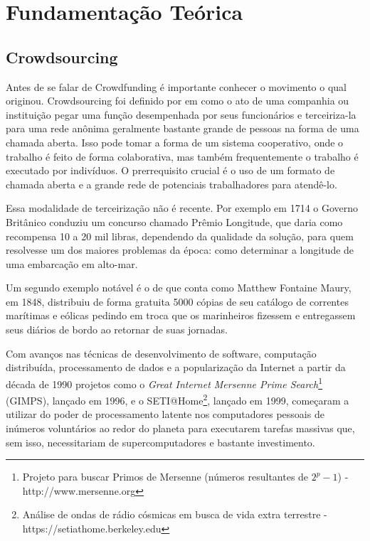 \chapter{Fundamentação Teórica}

\section{Crowdsourcing}
Antes de se falar de Crowdfunding é importante conhecer o movimento o qual originou. Crowdsourcing foi definido por \citeauthor{wired-crowdsource} em \citeyear{wired-crowdsource} como o ato de uma companhia ou instituição pegar uma função desempenhada por seus funcionários e terceiriza-la para uma rede anônima geralmente bastante grande de pessoas na forma de uma chamada aberta. Isso pode tomar a forma de um sistema cooperativo, onde o trabalho é feito de forma colaborativa, mas também frequentemente o trabalho é executado por indivíduos. O prerrequisito crucial é o uso de um formato de chamada aberta e a grande rede de potenciais trabalhadores para atendê-lo.

Essa modalidade de terceirização não é recente. Por exemplo em 1714 o Governo Britânico conduziu um concurso chamado Prêmio Longitude\cite{wiki-longitude_rewards}, que daria como recompensa 10 a 20 mil libras, dependendo da qualidade da solução, para quem resolvesse um dos maiores problemas da época: como determinar a longitude de uma embarcação em alto-mar.

Um segundo exemplo notável é o de \citeauthor{hearn2002tracks} que conta como Matthew Fontaine Maury, em 1848, distribuiu de forma gratuita 5000 cópias de seu catálogo de correntes marítimas e eólicas pedindo em troca que os marinheiros fizessem e entregassem seus diários de bordo ao retornar de suas jornadas.

Com avanços nas técnicas de desenvolvimento de software, computação distribuída, processamento de dados e a popularização da Internet a partir da década de 1990 projetos como o \emph{Great Internet Mersenne Prime Search}\footnote{Projeto para buscar Primos de Mersenne (números resultantes de \( 2^p - 1 \)) - http://www.mersenne.org} (GIMPS), lançado em 1996, e o SETI@Home\footnote{Análise de ondas de rádio cósmicas em busca de vida extra terrestre - https://setiathome.berkeley.edu}, lançado em 1999, começaram a utilizar do poder de processamento latente nos computadores pessoais de inúmeros voluntários ao redor do planeta para executarem tarefas massivas que, sem isso, necessitariam de supercomputadores e bastante investimento.

